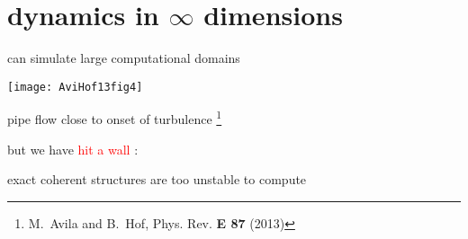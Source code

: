 %
%
%
%
%
%
%
%

\section[dynamics in $\infty$ dimensions]
{dynamics in $\infty$ dimensions}

\begin{frame}{can simulate {\Huge large} computational domains}
\begin{center}
\texttt{[image: AviHof13fig4]}
\end{center}
pipe flow close to onset of turbulence
\footnote{M.~Avila and B.~Hof, {Phys. Rev. \bf E 87} (2013)}

\bigskip

but we have \textcolor{red}{\Huge hit a wall} :

\hfill exact coherent structures are too unstable to compute
\end{frame}

